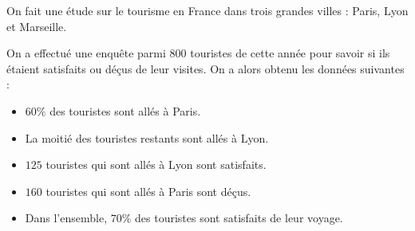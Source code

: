 \documentclass[
	classe=$1^{ere} STI2D$,
	headerTitle=Interrogation,
]{évaluation}
\begin{document}
\newpage

\maketitle

On fait une étude sur le tourisme en France dans trois grandes villes : Paris, Lyon et Marseille.

On a effectué une enquête parmi $800$ touristes de cette année pour savoir si ils étaient satisfaits ou déçus de leur visites. On a alors obtenu les données suivantes :

\begin{itemize}
	\item $60 \%$ des touristes sont allés à Paris.
	\item La moitié des touristes restants sont allés à Lyon.
	\item $125$ touristes qui sont allés à Lyon sont satisfaits.
	\item $160$ touristes qui sont allés à Paris sont déçus.
	\item Dans l'ensemble, $70$\% des touristes sont satisfaits de leur voyage.
\end{itemize}
\end{document}
